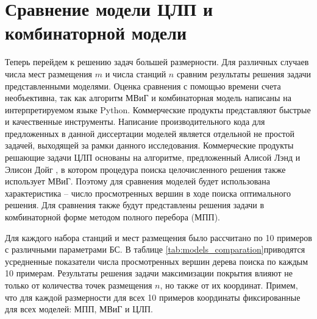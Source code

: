 \section{Сравнение модели ЦЛП и комбинаторной модели}

Теперь перейдем к решению задач большей размерности. Для различных случаев числа мест размещения $m$ и числа станций $n$ сравним результаты решения задачи представленными моделями. Оценка сравнения с помощью времени счета необъективна, так как алгоритм МВиГ и комбинаторная модель написаны на интерпретируемом языке Python. Коммерческие продукты представляют быстрые и качественные инструменты. Написание производительного кода для предложенных в данной диссертации моделей является отдельной не простой задачей, выходящей за рамки данного исследования. Коммерческие продукты решающие задачи ЦЛП основаны на алгоритме, предложенный Алисой Лэнд и Элисон Дойг \cite{Land1960}, в котором процедура поиска целочисленного решения также использует МВиГ.  Поэтому для сравнения моделей будет использована характеристика -- число просмотренных вершин в ходе поиска оптимального решения. Для сравнения также будут представлены решения задачи в комбинаторной форме методом полного перебора (МПП).

Для каждого набора станций и мест размещения было рассчитано по 10 примеров с различными параметрами БС. В таблице \cref{tab:models_comparation}приводятся усредненные показатели числа просмотренных вершин дерева поиска по каждым 10 примерам. Результаты решения задачи максимизации покрытия влияют не только от количества точек размещения $n$, но также от их координат. Примем, что для каждой размерности для всех 10 примеров координаты фиксированные для всех моделей: МПП, МВиГ и ЦЛП. 


